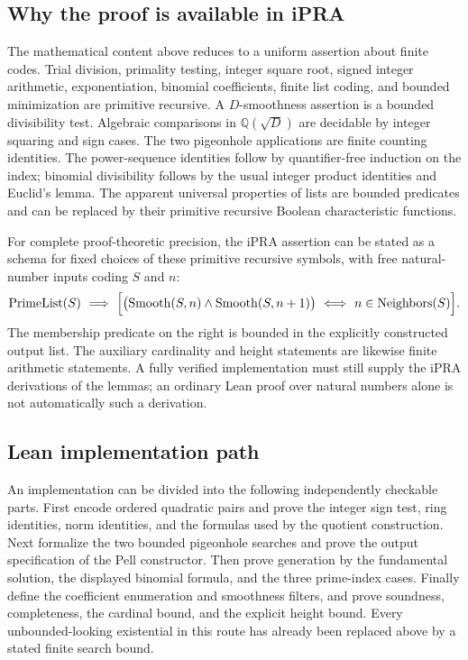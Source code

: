 \subsection{Why the proof is available in iPRA}

The mathematical content above reduces to a uniform assertion about finite
codes.  Trial division, primality testing, integer square root, signed integer
arithmetic, exponentiation, binomial coefficients, finite list coding, and
bounded minimization are primitive recursive.  A $D$-smoothness assertion is a
bounded divisibility test.  Algebraic comparisons in $\mathbb Q(\sqrt D)$ are
decidable by integer squaring and sign cases.  The two pigeonhole applications
are finite counting identities.  The power-sequence identities follow by
quantifier-free induction on the index; binomial divisibility follows by the
usual integer product identities and Euclid's lemma.  The apparent universal
properties of lists are bounded predicates and can be replaced by their
primitive recursive Boolean characteristic functions.

For complete proof-theoretic precision, the iPRA assertion can be stated as a
schema for fixed choices of these primitive recursive symbols, with free
natural-number inputs coding $S$ and $n$:
\[
 \operatorname{PrimeList}(S)\ \Longrightarrow\
 \Bigl[\bigl(\operatorname{Smooth}(S,n)\wedge
       \operatorname{Smooth}(S,n+1)\bigr)
 \ \Longleftrightarrow\ n\in\operatorname{Neighbors}(S)\Bigr].
\]
The membership predicate on the right is bounded in the explicitly constructed
output list.  The auxiliary cardinality and height statements are likewise
finite arithmetic statements.  A fully verified implementation must still
supply the iPRA derivations of the lemmas; an ordinary Lean proof over natural
numbers alone is not automatically such a derivation.

\subsection{Lean implementation path}

An implementation can be divided into the following independently checkable
parts.  First encode ordered quadratic pairs and prove the integer sign test,
ring identities, norm identities, and the formulas used by the quotient
construction.  Next formalize the two bounded pigeonhole searches and prove the
output specification of the Pell constructor.  Then prove generation by the
fundamental solution, the displayed binomial formula, and the three prime-index
cases.  Finally define the coefficient enumeration and smoothness filters,
and prove soundness, completeness, the cardinal bound, and the explicit height
bound.  Every unbounded-looking existential in this route has already been
replaced above by a stated finite search bound.

